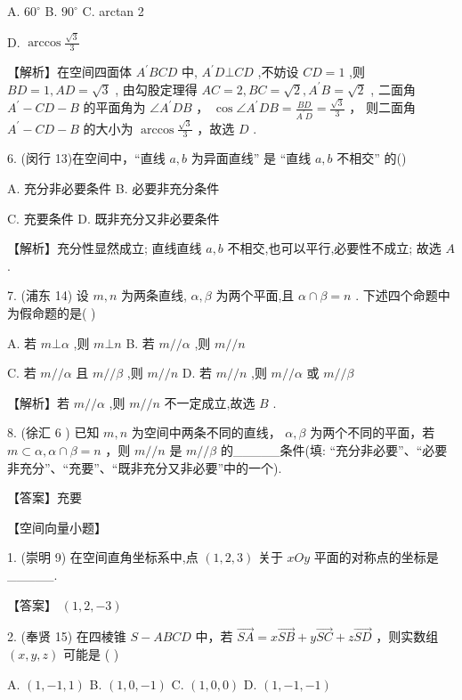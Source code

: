 \documentclass[10pt]{article}
\begin{document}
A. \({60}^{ \circ  }\) B. \({90}^{ \circ  }\) C. arctan 2

D. \(\arccos \frac{\sqrt{3}}{3}\)

【解析】在空间四面体 \({A}^{\prime }{BCD}\) 中, \({A}^{\prime }D \bot  {CD}\) ,不妨设 \({CD} = 1\) ,则 \({BD} = 1,{AD} = \sqrt{3}\) , 由勾股定理得 \({AC} = 2,{BC} = \sqrt{2},{A}^{\prime }B = \sqrt{2}\) , 二面角 \({A}^{\prime } - {CD} - B\) 的平面角为 \(\angle {A}^{\prime }{DB}\) ， \(\cos \angle {A}^{\prime }{DB} = \frac{BD}{{A}^{\prime }D} = \frac{\sqrt{3}}{3}\) ， 则二面角 \({A}^{\prime } - {CD} - B\) 的大小为 \(\arccos \frac{\sqrt{3}}{3}\) ，故选 \(D\) .

6. (闵行 13)在空间中，“直线 \(a,b\) 为异面直线” 是 “直线 \(a,b\) 不相交” 的()

A. 充分非必要条件 B. 必要非充分条件

C. 充要条件 D. 既非充分又非必要条件

【解析】充分性显然成立; 直线直线 \(a,b\) 不相交,也可以平行,必要性不成立; 故选 \(A\) .

7. (浦东 14) 设 \(m,n\) 为两条直线, \(\alpha ,\beta\) 为两个平面,且 \(\alpha  \cap  \beta  = n\) . 下述四个命题中为假命题的是( )

A. 若 \(m \bot  \alpha\) ,则 \(m \bot  n\) B. 若 \(m//\alpha\) ,则 \(m//n\)

C. 若 \(m//\alpha\) 且 \(m//\beta\) ,则 \(m//n\) D. 若 \(m//n\) ,则 \(m//\alpha\) 或 \(m//\beta\)

【解析】若 \(m//\alpha\) ,则 \(m//n\) 不一定成立,故选 \(B\) .

8. (徐汇 6 ) 已知 \(m,n\) 为空间中两条不同的直线， \(\alpha ,\beta\) 为两个不同的平面，若 \(m \subset  \alpha ,\alpha  \cap  \beta  = n\) ，则 \(m//n\) 是 \(m//\beta\) 的\_\_\_\_\_条件(填: “充分非必要”、“必要非充分”、“充要”、“既非充分又非必要”中的一个).

【答案】充要

【空间向量小题】

1. (崇明 9) 在空间直角坐标系中,点 \(\left( {1,2,3}\right)\) 关于 \({xOy}\) 平面的对称点的坐标是\_\_\_\_\_.

【答案】 \(\left( {1,2, - 3}\right)\)

2. (奉贤 15) 在四棱锥 \(S - {ABCD}\) 中，若 \(\overrightarrow{SA} = x\overrightarrow{SB} + y\overrightarrow{SC} + z\overrightarrow{SD}\) ，则实数组 \(\left( {x,y,z}\right)\) 可能是 ( )

A. \(\left( {1, - 1,1}\right)\) B. \(\left( {1,0, - 1}\right)\) C. \(\left( {1,0,0}\right)\) D. \(\left( {1, - 1, - 1}\right)\)
\end{document}
